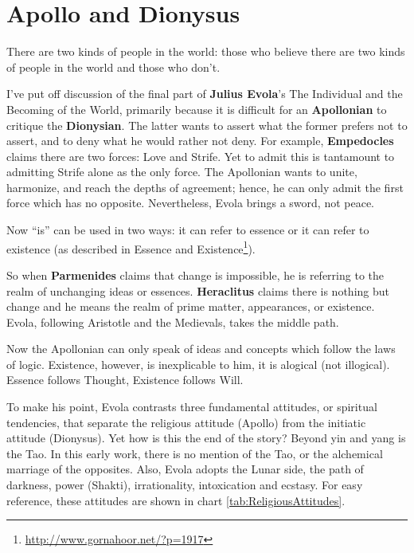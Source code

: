\section{Apollo and Dionysus}

\begin{quotex}
There are two kinds of people in the world: those who believe there are two kinds of people in the world and those who don't.
\end{quotex}


I've put off discussion of the final part of \textbf{Julius Evola}'s The Individual and the Becoming of the World, primarily because it is difficult for an \textbf{Apollonian} to critique the \textbf{Dionysian}. The latter wants to assert what the former prefers not to assert, and to deny what he would rather not deny. For example, \textbf{Empedocles} claims there are two forces: Love and Strife. Yet to admit this is tantamount to admitting Strife alone as the only force. The Apollonian wants to unite, harmonize, and reach the depths of agreement; hence, he can only admit the first force which has no opposite. Nevertheless, Evola brings a sword, not peace.

Now ``is'' can be used in two ways: it can refer to essence or it can refer to existence (as described in Essence and Existence\footnote{\url{http://www.gornahoor.net/?p=1917}}).

So when \textbf{Parmenides} claims that change is impossible, he is referring to the realm of unchanging ideas or essences. \textbf{Heraclitus} claims there is nothing but change and he means the realm of prime matter, appearances, or existence. Evola, following Aristotle and the Medievals, takes the middle path.

Now the Apollonian can only speak of ideas and concepts which follow the laws of logic. Existence, however, is inexplicable to him, it is alogical (not illogical). Essence follows Thought, Existence follows Will.

To make his point, Evola contrasts three fundamental attitudes, or spiritual tendencies, that separate the religious attitude (Apollo) from the initiatic attitude (Dionysus). Yet how is this the end of the story? Beyond yin and yang is the Tao. In this early work, there is no mention of the Tao, or the alchemical marriage of the opposites. Also, Evola adopts the Lunar side, the path of darkness, power (Shakti), irrationality, intoxication and ecstasy. For easy reference, these attitudes are shown in chart \ref{tab:ReligiousAttitudes}.

